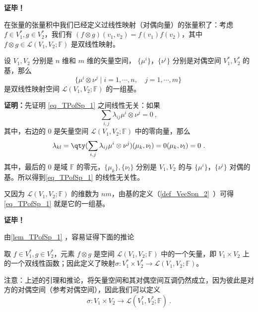 \textbf{证毕！}

在张量的张量积中我们已经定义过线性映射（对偶向量）的张量积了：考虑 $f \in V^*_1,g \in V^*_2$，我们有 $(f \otimes g)(v_1, v_2) = f(v_1) f(v_2)$，其中 $f \otimes g \in \mathcal L(V_1,V_2;\mathbb F)$ 是双线性映射。

\begin{lemma}{}\label{lem_TPofSp_1}
设 $V_1,V_2$ 分别是 $n$ 维和 $m$ 维的矢量空间， $\{\mu^i\}$，$\{\nu^i\}$ 分别是对偶空间 $V^*_1,V^*_2$ 的基，那么
\begin{equation}\label{eq_TPofSp_1}
\{\mu^i\otimes\nu^j \mid i=1,\cdots,n,\quad j=1,\cdots,m \}~
\end{equation}
是双线性映射空间 $\mathcal L(V_1,V_2;\mathbb F)$ 的一组基。
\end{lemma}


\textbf{证明：}先证明 \autoref{eq_TPofSp_1} 之间线性无关：如果
\begin{equation}
\sum_{i,j}\lambda_{ij}\mu^i\otimes\nu^j=0~,
\end{equation}
其中，右边的 $0$ 是矢量空间 $\mathcal L(V_1,V_2;\mathbb F)$
中的零向量，那么
\begin{equation}
\lambda_{kl}=\qty(\sum_{i,j}\lambda_{ij}\mu^i\otimes\nu^j)(\mu_k,\nu_l)=0(\mu_k,\nu_l)=0~.
\end{equation}
其中，最后的 $0$ 是域 $\mathbb F$ 的零元，$\{\mu_k\},\{\nu_l\}$ 分别是 $V_1,V_2$ 的与 $\{\mu^i\}$，$\{\nu^i\}$ 对偶的基。所以得到\autoref{eq_TPofSp_1} 的线性无关性。

又因为 $\mathcal L(V_1,V_2;\mathbb F)$ 的维数为 $nm$，由基的定义（\autoref{def_VecSpn_2}~）可得\autoref{eq_TPofSp_1} 就是它的一组基。

\textbf{证毕！}

由\autoref{lem_TPofSp_1} ，容易证得下面的推论
\begin{corollary}{}\label{cor_TPofSp_1}
取 $f \in V^*_1,g \in V^*_2$，元素 $f \otimes g$ 是空间 $\mathcal L(V_1,V_2;\mathbb F)$ 中的一个矢量，即 $V_1 \times V_2$ 上的一个双线性函数；因此定义了映射$\sigma: V^*_1 \times V^*_2 \to \mathcal L(V_1,V_2;\mathbb F)$。
\end{corollary}


注意：上述的引理和推论，将矢量空间和其对偶空间互调仍然成立，因为彼此是对方的对偶空间（参考对偶空间），因此我们可以定义
\begin{equation}
\sigma: V_1 \times V_2 \to \mathcal L(V^*_1,V^*_2;\mathbb F)~.
\end{equation}

